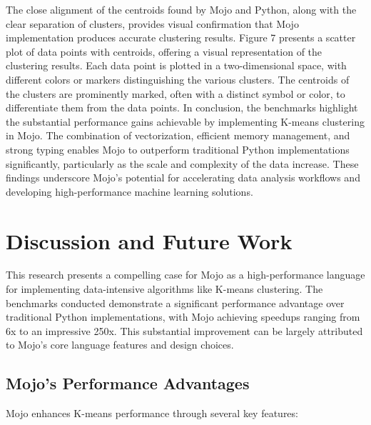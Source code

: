 \documentclass[conference]{IEEEtran}
\begin{document}
The close alignment of the centroids found by Mojo and Python, along with the clear separation of clusters, provides visual confirmation that Mojo implementation produces accurate clustering results. Figure 7 presents a scatter plot of data points with centroids, offering a visual representation of the clustering results. Each data point is plotted in a two-dimensional space, with different colors or markers distinguishing the various clusters. The centroids of the clusters are prominently marked, often with a distinct symbol or color, to differentiate them from the data points. In conclusion, the benchmarks highlight the substantial performance gains achievable by implementing K-means clustering in Mojo. The combination of vectorization, efficient memory management, and strong typing enables Mojo to outperform traditional Python implementations significantly, particularly as the scale and complexity of the data increase. These findings underscore Mojo's potential for accelerating data analysis workflows and developing high-performance machine learning solutions.


\section{Discussion and Future Work}
This research presents a compelling case for Mojo as a high-performance language for implementing data-intensive algorithms like K-means clustering. The benchmarks conducted demonstrate a significant performance advantage over traditional Python implementations, with Mojo achieving speedups ranging from 6x to an impressive 250x. This substantial improvement can be largely attributed to Mojo's core language features and design choices.

\subsection{Mojo's Performance Advantages}
Mojo enhances K-means performance through several key features:
\end{document}
